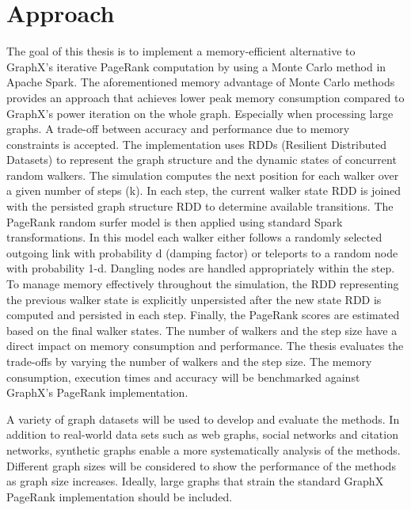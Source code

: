 \documentclass[a4paper,12pt]{article}
\begin{document}
\section{Approach}
The goal of this thesis is to implement a memory-efficient alternative to GraphX's iterative PageRank computation by using a Monte Carlo method in Apache Spark. The aforementioned memory advantage of Monte Carlo methods provides an approach that achieves lower peak memory consumption compared to GraphX's power iteration on the whole graph. Especially when processing large graphs. A trade-off between accuracy and performance due to memory constraints is accepted. 
The implementation uses RDDs (Resilient Distributed Datasets) to represent the graph structure and the dynamic states of concurrent random walkers. The simulation computes the next position for each walker over a given number of steps (k). In each step, the current walker state RDD is joined with the persisted graph structure RDD to determine available transitions. The PageRank random surfer model is then applied using standard Spark transformations. In this model each walker either follows a randomly selected outgoing link with probability d (damping factor) or teleports to a random node with probability 1-d. Dangling nodes are handled appropriately within the step. To manage memory effectively throughout the simulation, the RDD representing the previous walker state is explicitly unpersisted after the new state RDD is computed and persisted in each step. Finally, the PageRank scores are estimated based on the final walker states. The number of walkers and the step size have a direct impact on memory consumption and performance. The thesis evaluates the trade-offs by varying the number of walkers and the step size. The memory consumption, execution times and accuracy will be benchmarked against GraphX's PageRank implementation. \par
A variety of graph datasets will be used to develop and evaluate the methods. In addition to real-world data sets such as web graphs, social networks and citation networks, synthetic graphs enable a more systematically analysis of the methods. Different graph sizes will be considered to show the performance of the methods as graph size increases. Ideally, large graphs that strain the standard GraphX PageRank implementation should be included. 




\end{document}
